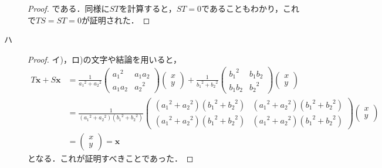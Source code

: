 \documentclass[uplatex,dvipdfmx,a4paper,10pt,fleqn]{jsarticle}
\begin{document}
\begin{tleftbar}
\begin{description}
\begin{proof}
        である．同様に$ST$を計算すると，$ST=0$であることもわかり，これで$TS=ST=0$が証明された．
    \end{proof}
\item[ハ]
    \begin{proof}
    イ)，ロ)の文字や結論を用いると，
        \begin{align*}
        T \bm{x} + S \bm{x} & =
        \frac{1}{{a_1}^2+{a_2}^2}
        \begin{pmatrix}
            {a_1}^2 & a_1 a_2 \\
            a_1 a_2 & {a_2}^2
        \end{pmatrix}
        \begin{pmatrix}
            x \\
            y
        \end{pmatrix}
        +
        \frac{1}{{b_1}^2+{b_2}^2}
        \begin{pmatrix}
            {b_1}^2 & b_1 b_2 \\
            b_1 b_2 & {b_2}^2
        \end{pmatrix}
        \begin{pmatrix}
            x \\
            y
        \end{pmatrix}
        \\
        & = \frac{1}{({a_1}^2+{a_2}^2)({b_1}^2+{b_2}^2)}
        \begin{pmatrix}
            ({a_1}^2+{a_2}^2)({b_1}^2+{b_2}^2) & ({a_1}^2+{a_2}^2)({b_1}^2+{b_2}^2) \\
            ({a_1}^2+{a_2}^2)({b_1}^2+{b_2}^2) & ({a_1}^2+{a_2}^2)({b_1}^2+{b_2}^2)
        \end{pmatrix}
        \begin{pmatrix}
            x \\
            y
        \end{pmatrix}
        \\
        & =\begin{pmatrix}
            x \\
            y
        \end{pmatrix}
        =\bm{x}
    \end{align*}
    となる．これが証明すべきことであった．
\end{proof}
\end{description}
\end{tleftbar}
\end{document}
